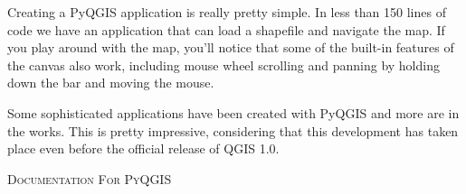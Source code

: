 Creating a PyQGIS application is really pretty simple.  In less than 150 lines
of code we have an application that can load a shapefile and navigate the map.
If you play around with the map, you'll notice that some of the built-in
features of the canvas also work, including mouse wheel scrolling and panning
by holding down the  bar and moving the mouse.

Some sophisticated applications have been created with PyQGIS and more are in 
the works. This is pretty impressive, considering that this development has 
taken place even before the official release of QGIS 1.0.

\begin{Tip}\caption{\textsc{Documentation For PyQGIS}}
\end{Tip} 
